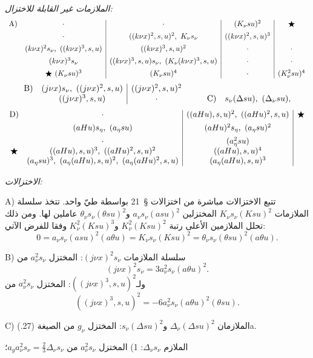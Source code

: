 \documentclass[11pt]{article}
\providecommand{\A}{\Delta}
\begin{document}
\noindent\emph{الملازمات غير القابلة للاختزال:}
\[
\begin{array}{c@{\quad}c|c|c|c}
\text{A)}& \cdot & \cdot & (K_\nu su)^2 & \bigstar\\[0.45em]
& \cdot & ((k\nu x)^2,s,u)^2,\ K_\nu s_\nu & ((k\nu x)^2,s,u)^3 & \\[0.45em]
& (k\nu x)^2s_\nu,\ ((k\nu x)^3,s,u) & ((k\nu x)^3,s,u)^2 & \cdot & \cdot\\[0.45em]
& (k\nu x)^3s_\nu & ((k\nu x)^3,s,u)s_\nu,\ (K_\nu(k\nu x)^3,s,u) & \cdot & \cdot\\[0.45em]
& \bigstar\ (K_\nu su)^3 & (K_\nu su)^4 & \cdot & (K_\nu^2su)^4
\end{array}
\]
\[
\begin{array}{c@{\quad}c|c@{\qquad}c@{\quad}c}
\text{B)}& (j\nu x)s_\nu,\ ((j\nu x)^2,s,u) & ((j\nu x)^2,s,u)^2 && \\
& ((j\nu x)^3,s,u) & \cdot && \text{C)}\quad s_\nu(\A su),\ (\A_\nu su),
\end{array}
\]
\[
\begin{array}{c@{\quad}c|c|c}
\text{D)}& \cdot & ((aHu),s,u)^2,\ ((aHu)^2,s,u) & \bigstar\\[0.45em]
& (aHu)s_\eta,\ (a_\eta su) & (aHu)^2s_\eta,\ (a_\eta su)^2 & \\[0.45em]
& \cdot & (a_\eta^2su) & \\
\bigstar& ((aHu),s,u)^3,\ ((aHu)^2,s,u)^2 & ((aHu),s,u)^4 & \\
& (a_\eta su)^3,\ (a_\eta(aHu),s,u)^2,\ (a_\eta(aHu)^2,s,u) & (a_\eta(aHu),s,u)^3 &
\end{array}
\]

\noindent\emph{الاختزالات:}

A) تتبع الاختزالات مباشرة من اختزالات \S\ 21 بواسطة طيّ واحد. تتخذ سلسلة الملازمات $K_\nu s_\nu(Ksu)^2$ المختزلين $a_\nu s_\nu(asu)^2$ و$\theta_\nu s_\nu(\theta su)^2$ عاملين لها. ومن ذلك تحلل الملازمين الأعلى رتبة $K_\nu^2(Ksu)^2$ و$K_\nu^2(Ksu)^3$ وفقا للفرض الآتي:
\[
0=a_\nu s_\nu(asu)^2(a\theta u)=K_\nu s_\nu(Ksu)^2=\theta_\nu s_\nu(\theta su)^2(a\theta u).
\]

B) سلسلة الملازمات $(j\nu x)^2s_\nu$: المختزل $a_\nu^2s_\nu$ من
\[
(j\nu x)^2s_\nu=3a_\nu^2s_\nu(a\theta u)^2.
\]
ولـ$((j\nu x)^3,s,u)^2$: المختزل $a_\nu^2s_\nu$ من
\[
((j\nu x)^3,s,u)^2=-6a_\nu^2s_\nu(a\theta u)^2(\theta su).
\]

C) الملازمان $\A_\nu(\A su)^2$ و$s_\nu(\A su)^2$: المختزل $g_\nu$ من الصيغة (27.)a.

الملازم $\A_\nu s_\nu$: 1) المختزل $a_\nu^2s_\nu$ من $a_ga_\nu^2s_\nu=\frac23\A_\nu s_\nu$؛
\end{document}
